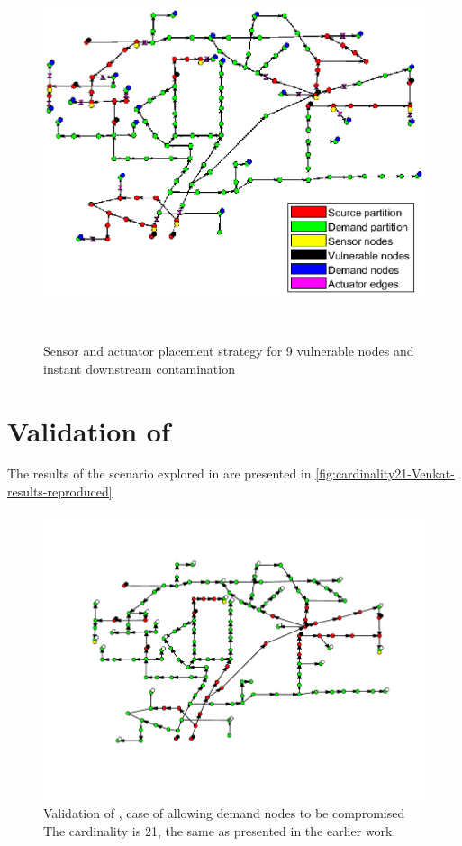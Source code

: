 \documentclass[authoryear,preprint,review,12pt]{elsarticle}
\begin{document}
\begin{figure}[ht]
\includegraphics[width=\linewidth]{images/containment_9sources_1downstreamSourceEach_legend}\caption{Sensor and actuator placement strategy for 9 vulnerable nodes and
instant downstream contamination\protect} \\
    \label{fig:containment_9sources_1downstreamSourceEach}
\end{figure}




\section{Validation of \cite{palleti_actuator_2018}}
The results of the scenario explored in \cite{palleti_actuator_2018} are presented in \autoref{fig:cardinality21-Venkat-results-reproduced}
\begin{figure}[!hptb]
\protect\includegraphics[width=\linewidth]{images/cardinality21_Venkat_results_reproduced}\protect\caption{Validation of \cite{palleti_actuator_2018}, case of allowing demand nodes to be compromised
\protect \\
The cardinality is 21, the same as presented in the earlier work.}

    \label{fig:cardinality21-Venkat-results-reproduced}
\end{figure}
\end{document}
